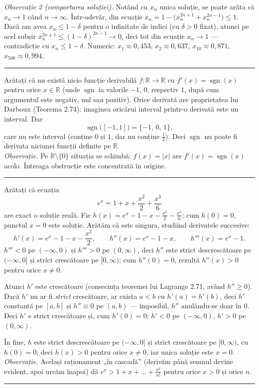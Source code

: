 \emph{Observație 2 (comportarea soluției).} Notând cu $x_n$ unica soluție, se poate arăta că $x_n\to1$ când $n\to\infty$. Într-adevăr, din ecuație $x_n=1-\bigl(x_n^{2n+1}+x_n^{2n-1}\bigr)\le1$. Dacă am avea $x_n\le1-\delta$ pentru o infinitate de indici (cu $\delta>0$ fixat), atunci pe acel subșir $x_n^{2n\pm1}\le(1-\delta)^{2n-1}\to0$, deci tot din ecuație $x_n\to1$ --- contradicție cu $x_n\le1-\delta$. Numeric: $x_1\approx0{,}453$, $x_2\approx0{,}637$, $x_{10}\approx0{,}871$, $x_{500}\approx0{,}994$.
\vspace{1mm}\hrule

Arătați că nu există nicio funcție derivabilă $f:\mathbb{R}\to\mathbb{R}$ cu $f'(x)=\operatorname{sgn}(x)$ pentru orice $x\in\mathbb{R}$ (unde $\operatorname{sgn}$ ia valorile $-1$, $0$, respectiv $1$, după cum argumentul este negativ, nul sau pozitiv).
\sol Orice derivată are proprietatea lui Darboux (Teorema 2.74): imaginea oricărui interval printr-o derivată este un interval. Dar
\[ \operatorname{sgn}\bigl([-1,1]\bigr)=\{-1,\,0,\,1\}, \]
care nu este interval (conține $0$ și $1$, dar nu conține $\tfrac12$). Deci $\operatorname{sgn}$ nu poate fi derivata niciunei funcții definite pe $\mathbb{R}$.\\[2pt]
\emph{Observație.} Pe $\mathbb{R}\setminus\{0\}$ situația se schimbă: $f(x)=|x|$ are $f'(x)=\operatorname{sgn}(x)$ acolo. Întreaga obstrucție este concentrată în origine.
\vspace{1mm}\hrule

Arătați că ecuația
\[ e^x=1+x+\frac{x^2}{2}+\frac{x^3}{6} \]
are exact o soluție reală.
\sol Fie $h(x)=e^x-1-x-\frac{x^2}2-\frac{x^3}6$; cum $h(0)=0$, punctul $x=0$ este soluție. Arătăm că este singura, studiind derivatele succesive:
\[ h'(x)=e^x-1-x-\frac{x^2}2,\qquad h''(x)=e^x-1-x,\qquad h'''(x)=e^x-1 . \]
$h'''<0$ pe $(-\infty,0)$ și $h'''>0$ pe $(0,\infty)$, deci $h''$ este strict descrescătoare pe $(-\infty,0]$ și strict crescătoare pe $[0,\infty)$; cum $h''(0)=0$, rezultă $h''(x)>0$ pentru orice $x\neq0$.

Atunci $h'$ este crescătoare (consecința teoremei lui Lagrange 2.71, având $h''\ge0$). Dacă $h'$ nu ar fi \emph{strict} crescătoare, ar exista $a<b$ cu $h'(a)=h'(b)$, deci $h'$ constantă pe $[a,b]$ și $h''\equiv0$ pe $(a,b)$ --- imposibil, $h''$ anulându-se doar în $0$. Deci $h'$ e strict crescătoare și, cum $h'(0)=0$: $h'<0$ pe $(-\infty,0)$, $h'>0$ pe $(0,\infty)$.

În fine, $h$ este strict descrescătoare pe $(-\infty,0]$ și strict crescătoare pe $[0,\infty)$, cu $h(0)=0$; deci $h(x)>0$ pentru orice $x\neq0$, iar unica soluție este $x=0$.\\[2pt]
\emph{Observație.} Același raționament „în cascadă'' (derivăm până semnul devine evident, apoi urcăm înapoi) dă $e^x>1+x+\dots+\frac{x^n}{n!}$ pentru orice $x>0$ și orice $n$.
\vspace{1mm}\hrule

